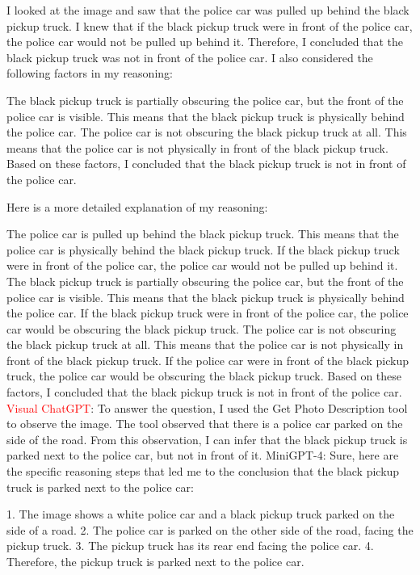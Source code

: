 \begin{enumerate}
        I looked at the image and saw that the police car was pulled up behind the black pickup truck.
        I knew that if the black pickup truck were in front of the police car, the police car would not be pulled up behind it.
        Therefore, I concluded that the black pickup truck was not in front of the police car.
        I also considered the following factors in my reasoning:
        
        The black pickup truck is partially obscuring the police car, but the front of the police car is visible. This means that the black pickup truck is physically behind the police car.
        The police car is not obscuring the black pickup truck at all. This means that the police car is not physically in front of the black pickup truck.
        Based on these factors, I concluded that the black pickup truck is not in front of the police car.
        
        Here is a more detailed explanation of my reasoning:
        
        The police car is pulled up behind the black pickup truck. This means that the police car is physically behind the black pickup truck. If the black pickup truck were in front of the police car, the police car would not be pulled up behind it.
        The black pickup truck is partially obscuring the police car, but the front of the police car is visible. This means that the black pickup truck is physically behind the police car. If the black pickup truck were in front of the police car, the police car would be obscuring the black pickup truck.
        The police car is not obscuring the black pickup truck at all. This means that the police car is not physically in front of the black pickup truck. If the police car were in front of the black pickup truck, the police car would be obscuring the black pickup truck.
        Based on these factors, I concluded that the black pickup truck is not in front of the police car.
        \subitem \textcolor{red}{Visual ChatGPT}: To answer the question, I used the Get Photo Description tool to observe the image. The tool observed that there is a police car parked on the side of the road. From this observation, I can infer that the black pickup truck is parked next to the police car, but not in front of it.
        \subitem MiniGPT-4: Sure, here are the specific reasoning steps that led me to the conclusion that the black pickup truck is parked next to the police car:

        1. The image shows a white police car and a black pickup truck parked on the side of a road.
        2. The police car is parked on the other side of the road, facing the pickup truck.
        3. The pickup truck has its rear end facing the police car.
        4. Therefore, the pickup truck is parked next to the police car.
        

\end{enumerate}
